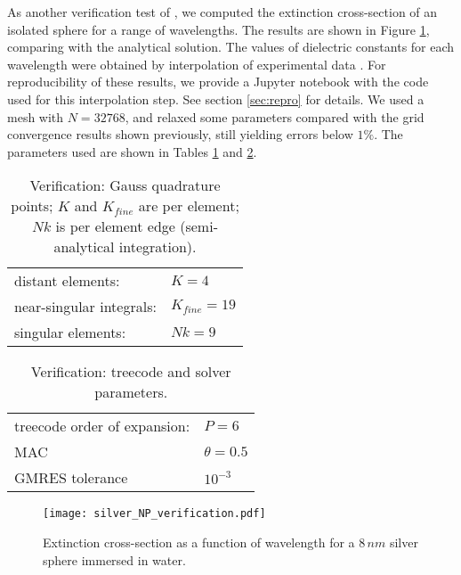As another verification test of \pygbe, we computed the extinction cross-section of an 
isolated sphere for a range of wavelengths. 
The results are shown in Figure \ref{fig:verif_sphere}, comparing with the analytical solution. 
The values of dielectric constants for each wavelength were obtained by interpolation of 
experimental data \cite{JohnsonChristy1972, HaleQuerry1972}.
For reproducibility of these results, we provide a Jupyter notebook with the code used for this interpolation step.
See section \ref{sec:repro} for details.
We used a mesh with $N=32768$, and relaxed some parameters compared with the grid convergence results shown previously, still yielding errors below $1\%$.
The parameters used are shown in Tables \ref{table:quadparams2} and \ref{table:treeparams2}.



\begin{table}[h]
    \centering
    \caption{\label{table:quadparams2} Verification: Gauss quadrature points; 
    $K$ and $K_{fine}$ are per element; $Nk $ is per element edge (semi-analytical integration). } 
    \begin{tabular}{l l}
    \hline%
     distant elements: & $K=4$ \\
     near-singular integrals:   & $ K_{fine}=19$ \\
     singular elements:  & $Nk =9$ \\
    \hline%
    \end{tabular}
\end{table}


\begin{table}[h]
    \centering
    \caption{\label{table:treeparams2} Verification: treecode and solver parameters.} 
    \begin{tabular}{l l}
    \hline%
    treecode order of expansion: & $P=6$\\
    MAC                                         & $\theta=0.5$\\
    GMRES tolerance                    & $10^{-3}$\\
    \hline%
    \end{tabular}
\end{table}


\begin{figure}[h] %
   \centering
   \texttt{[image: silver\_NP\_verification.pdf]} 
   \caption{Extinction cross-section as a function of wavelength for a $8 \, nm$
            silver sphere immersed in water.}
   \label{fig:verif_sphere}
\end{figure}

